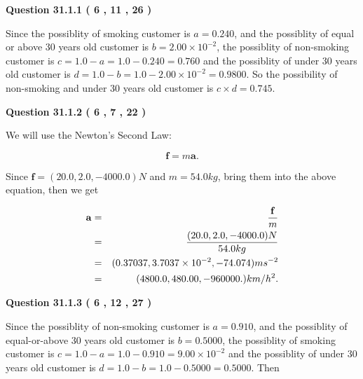 \documentclass[12pt]{article}
\begin{document}
   
  
\vspace{0.2in}
  
{\textbf{\Large{Question
31.1.1 
 (           6 ,          11 ,          26 )
}}}
  
  
 
 

Since the possiblity of  %
smoking customer is $ a =  %
0.240 $,
and the possiblity of  %
equal or above 30 years old customer is $ b =  %
2.00 \times 10^{-2} $,
the possiblity of  %
non-smoking customer is $ c = 1.0 - a = 1.0 -
0.240
=  %
0.760 $ and the possiblity of  %
under 30 years old
customer is $ d = 1.0 - b = 1.0 -  %
2.00 \times 10^{-2} =  %
0.9800  $.
So the possibility of  %
 non-smoking and  %
under 30 years old
customer is $ c \times d =  %
0.745 $.
 
 
 
  
\vspace{0.2in}
  
{\textbf{\Large{Question
31.1.2 
 (           6 ,           7 ,          22 )
}}}
  
  
 
 

We will use the Newton's Second Law:
 
\[
\mathbf{f}=m\mathbf{a}.
\]
 
Since $\mathbf{f}=( %
20.0,  %
2.0,  %
-4000.0 )N$
and $m= %
54.0 kg$, bring them into the above equation, then we get
 
\begin{eqnarray*}
\mathbf{a}&=&\frac{\mathbf{f}}m  \\
&=&\frac{(
20.0 ,
2.0 ,
-4000.0 )N
}{ %
54.0 kg}  \\
&=&(
0.37037 ,
3.7037 \times 10^{-2},
-74.074
)ms^{-2} \\
&=&(
4800.0 ,
480.00 ,
-960000.
)km/h^2.
\end{eqnarray*}
 
 
 
  
\vspace{0.2in}
  
{\textbf{\Large{Question
31.1.3 
 (           6 ,          12 ,          27 )
}}}
  
  
 
 

Since the possiblity of  %
 non-smoking customer is $ a =  %
0.910 $,
and the possiblity of  %
equal-or-above 30 years old customer is $ b =  %
0.5000 $,
the possiblity of  %
smoking customer is $ c = 1.0 - a = 1.0 -
0.910
=  %
9.00 \times 10^{-2} $ and the possiblity of  %
under 30 years old
customer is $ d = 1.0 - b = 1.0 -  %
0.5000 =  %
0.5000  $.
Then
 
\end{document}
